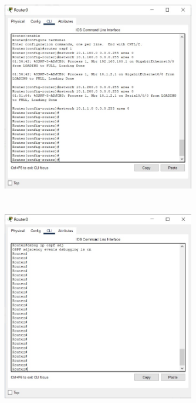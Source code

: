 \documentclass{article}
\begin{document}
\begin{figure}[H]
    \centering
    \includegraphics[width=0.75\textwidth]{figures/12.jpg}
    \caption{}
    \label{fig:fig1}
\end{figure}



\section{}%

\begin{figure}[H]
    \centering
    \includegraphics[width=0.75\textwidth]{figures/13.jpg}
    \caption{}
    \label{fig:fig1}
\end{figure}
\end{document}
